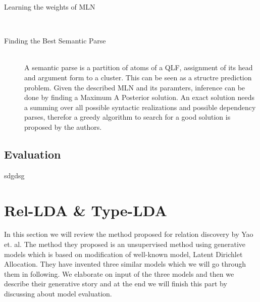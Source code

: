 \documentclass[12pt]{report}
\begin{document}
\begin{description}
  
  
  \item[Learning the weights of MLN] \hfill \\
  \item[Finding the Best Semantic Parse] \hfill \\
  A semantic parse is a partition of atoms of a QLF, assignment of its head and argument form to a cluster. 
  This can be seen as a structre prediction problem. Given the described MLN and its paramters, inference can
   be done by finding a Maximum A Posterior solution. An exact solution needs a summing over all possible syntactic realizations and
   possible dependency parses, therefor a greedy algorithm to search for a good solution is proposed 
   by the authors.   
\end{description}









\subsection {Evaluation}
\label{ch:evaluation}
sdgdsg

\section{Rel-LDA \& Type-LDA}
\label{ch:unsupervised}

In this section we will review the method proposed for relation discovery  by Yao et. al. 
The method they  proposed is an unsupervised method using generative models which is based on 
modification of well-known model, Latent Dirichlet Allocation. 
They have invented three similar models which we will go through them in following. 
We elaborate on input of the three models and then we describe their generative story 
and at the end we will finish this part by discussing about  model evaluation.
\end{document}
